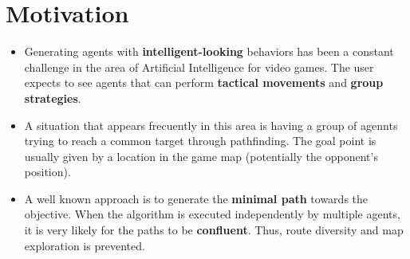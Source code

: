 \section*{\large{Motivation}}
\begin{large}
\begin{itemize}
\item Generating agents with \textbf{intelligent-looking} behaviors
has been a constant challenge in the area of Artificial
Intelligence for video games. The user expects to see
agents that can perform \textbf{tactical movements} and
\textbf{group strategies}.


\item 
A situation that appears frecuently in this area 
is having a group of agennts trying to reach 
 a common target  through pathfinding.
The goal point is usually given by a location in the game map
(potentially the opponent's position).

\item A well known approach is to generate the \textbf{minimal path}
towards the objective.
When the algorithm is executed independently by multiple agents,
it is very likely for the paths to be \textbf{confluent}. Thus,
route diversity and map exploration is prevented.


\end{itemize}
\end{large}
